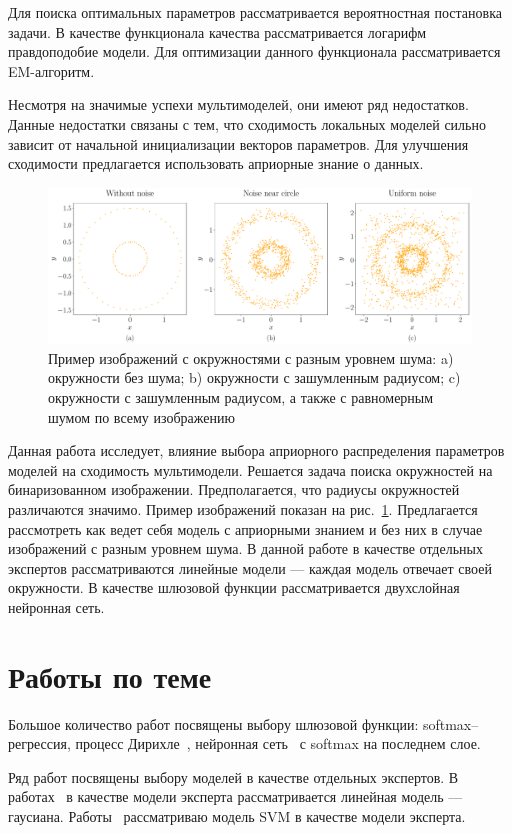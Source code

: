\documentclass[12pt, twoside]{article}
\numberwithin{equation}{section}
\begin{document}
Для поиска оптимальных параметров рассматривается вероятностная постановка задачи. В качестве функционала качества рассматривается логарифм правдоподобие модели. Для оптимизации данного функционала рассматривается EM-алгоритм.

Несмотря на значимые успехи мультимоделей, они имеют ряд недостатков. Данные недостатки связаны с тем, что сходимость локальных моделей сильно зависит от начальной инициализации векторов параметров. Для улучшения сходимости предлагается использовать априорные знание о данных.

\begin{figure}[h!t]\center
\includegraphics[width=1\textwidth]{results/statment}
\caption{Пример изображений с окружностями с разным уровнем шума: a) окружности без шума; b) окружности с зашумленным радиусом; c) окружности с зашумленным радиусом, а также с равномерным шумом по всему изображению}
\label{example:1}
\end{figure}

Данная работа исследует, влияние выбора априорного распределения параметров моделей на сходимость мультимодели. Решается задача поиска окружностей на бинаризованном изображении. Предполагается, что радиусы окружностей различаются значимо. Пример изображений показан на рис.~\ref{example:1}. Предлагается рассмотреть как ведет себя модель с априорными знанием и без них в случае изображений с разным уровнем шума. В данной работе в качестве отдельных экспертов рассматриваются линейные модели --- каждая модель отвечает своей окружности. В качестве шлюзовой функции рассматривается двухслойная нейронная сеть.

\section{Работы по теме}
Большое количество работ посвящены выбору шлюзовой функции: softmax--регрессия, процесс Дирихле~\cite{Edward2002}, нейронная сеть~\cite{Shazeer2017} с softmax на последнем слое.

Ряд работ посвящены выбору моделей в качестве отдельных экспертов. В работах~\cite{Jordan1994, Jordan1991} в качестве модели эксперта рассматривается линейная модель --- гаусиана. Работы~\cite{Lima2007, Cao2003} рассматриваю модель SVM в качестве модели эксперта.
\end{document}
